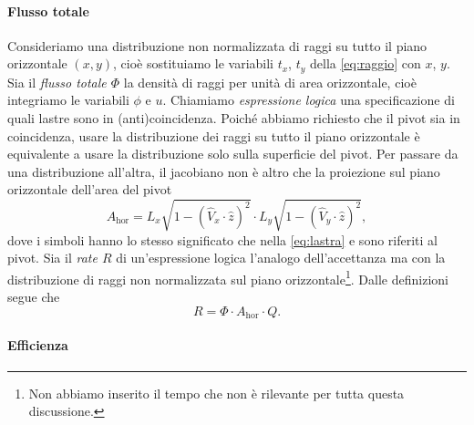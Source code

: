 \paragraph{Flusso totale}

Consideriamo una distribuzione non normalizzata di raggi su tutto il piano orizzontale $(x,y)$,
cioè sostituiamo le variabili $t_x$, $t_y$ della \eqref{eq:raggio} con $x$, $y$.
Sia il \emph{flusso totale $\Phi$} la densità di raggi per unità di area orizzontale,
cioè integriamo le variabili $\phi$ e $u$.
Chiamiamo \emph{espressione logica} una specificazione di quali lastre sono in (anti)coincidenza.
Poiché abbiamo richiesto che il pivot sia in coincidenza,
usare la distribuzione dei raggi su tutto il piano orizzontale è equivalente
a usare la distribuzione solo sulla superficie del pivot.
Per passare da una distribuzione all'altra,
il jacobiano non è altro che la proiezione sul piano orizzontale dell'area del pivot
\begin{equation*}
	A_\text{hor} = L_x \sqrt{1-(\hat V_x\cdot\hat z)^2} \cdot L_y \sqrt{1-(\hat V_y\cdot\hat z)^2},
\end{equation*}
dove i simboli hanno lo stesso significato che nella \eqref{eq:lastra}
e sono riferiti al pivot.
Sia il \emph{rate $R$} di un'espressione logica l'analogo dell'accettanza
ma con la distribuzione di raggi non normalizzata sul piano orizzontale\footnote{Non abbiamo inserito il tempo che non è rilevante per tutta questa discussione.}.
Dalle definizioni segue che
\begin{equation}
	\label{eq:rate}
	R = \Phi \cdot A_\text{hor} \cdot Q.
\end{equation}

\paragraph{Efficienza}

